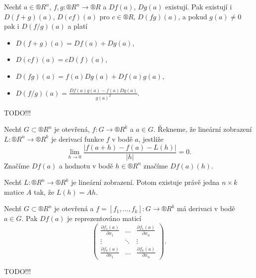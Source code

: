 \documentclass[12pt]{article}					%
\begin{document}
	\begin{veta}
		Nechť $a \in ®R^n$, $f, g: ®R^n \rightarrow ®R$ a $D f(a)$, $D g(a)$ existují. Pak existují i $D(f + g)(a)$, $D(c f)(a)$ pro $c \in ®R$, $D(f g)(a)$, a pokud $g(a) ≠ 0$ pak i $D(f / g)(a)$ a platí
		
		\begin{itemize}
			\item $D(f + g)(a) = D f(a) + D g(a)$,
			\item $D(c f)(a) = c D(f)(a)$,
			\item $D(f g)(a) = f(a) D g(a) + D f(a) g(a)$,
			\item $D(f / g)(a) = \frac{D f(a) g(a) - f(a) D g(a)}{g(a)^2}$.
		\end{itemize}

		\begin{dukazin}
			TODO!!!
		\end{dukazin}
	\end{veta}

	\begin{definice}
		Nechť $G \subset ®R^n$ je otevřená, $f: G \rightarrow ®R^k$ a $a \in G$. Řekneme, že lineární zobrazení $L: ®R^n \rightarrow ®R^k$ je derivací funkce $f$ v bodě $a$, jestliže
		$$ \lim_{h \rightarrow 0} \frac{|f(a + h) - f(a) - L(h)|}{|h|} = 0. $$
		Značíme $D f(a)$ a hodnotu v bodě $h \in ®R^n$ značíme $D f(a)(h)$.
	\end{definice}

	\begin{poznamka}
		Nechť $L: ®R^n \rightarrow ®R^k$ je lineární zobrazení. Potom existuje právě jedna $n \times k$ matice $A$ tak, že $L(h) = A h$.
	\end{poznamka}


	\begin{veta}
		Nechť $G \subset ®R^n$ je otevřená a $f = [f_1, …, f_k]: G \rightarrow ®R^k$ má derivaci v bodě $a \in G$. Pak $D f(a)$ je reprezentováno maticí
		$$ \begin{pmatrix} \frac{\partial f_1(a)}{\partial x_1} & … & \frac{\partial f_1(a)}{\partial x_n} \\ \vdots & \ddots & \vdots \\ \frac{\partial f_k(a)}{\partial x_1} & … & \frac{\partial f_k(a)}{\partial x_n} \end{pmatrix}. $$

		\begin{dukazin}
			TODO!!!
		\end{dukazin}
	\end{veta}
\end{document}
